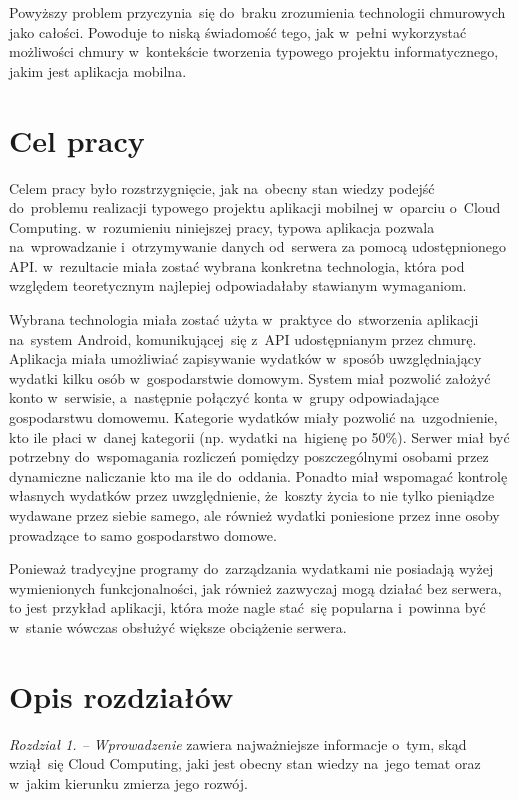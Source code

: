 \documentclass[12pt,a4paper,twoside,titlepage,openright]{book}
\begin{document}
Powyższy problem przyczynia~się do~braku zrozumienia technologii chmurowych jako całości. Powoduje to niską świadomość tego, jak w~pełni wykorzystać możliwości chmury w~kontekście tworzenia typowego projektu informatycznego, jakim jest aplikacja mobilna.





\section*{Cel pracy}


Celem pracy było rozstrzygnięcie, jak na~obecny stan wiedzy podejść do~problemu realizacji typowego projektu aplikacji mobilnej w~oparciu o~Cloud Computing. w~rozumieniu niniejszej pracy, typowa aplikacja pozwala na~wprowadzanie i~otrzymywanie danych od~serwera za pomocą udostępnionego API. w~rezultacie miała zostać wybrana konkretna technologia, która pod względem teoretycznym najlepiej odpowiadałaby stawianym wymaganiom.

Wybrana technologia miała zostać użyta w~praktyce do~stworzenia aplikacji na~system Android, komunikującej~się z~API udostępnianym przez chmurę. Aplikacja miała umożliwiać zapisywanie wydatków w~sposób uwzględniający wydatki kilku osób w~gospodarstwie domowym. System miał pozwolić założyć konto w~serwisie, a~następnie połączyć konta w~grupy odpowiadające gospodarstwu domowemu. Kategorie wydatków miały pozwolić na~uzgodnienie, kto ile płaci w~danej kategorii (np. wydatki na~higienę po 50\%). Serwer miał być potrzebny do~wspomagania rozliczeń pomiędzy poszczególnymi osobami przez dynamiczne naliczanie kto ma ile do~oddania. Ponadto miał wspomagać kontrolę własnych wydatków przez uwzględnienie, że~koszty życia to nie tylko pieniądze wydawane przez siebie samego, ale również wydatki poniesione przez inne osoby prowadzące to samo gospodarstwo domowe. 

Ponieważ tradycyjne programy do~zarządzania wydatkami nie posiadają wyżej wymienionych funkcjonalności, jak również zazwyczaj mogą działać bez serwera, to jest przykład aplikacji, która może nagle stać~się popularna i~powinna być w~stanie wówczas obsłużyć większe obciążenie serwera. 



\section*{Opis rozdziałów}
\textit{Rozdział 1. -- Wprowadzenie} zawiera najważniejsze informacje o~tym, skąd wziął~się Cloud Computing, jaki jest obecny stan wiedzy na~jego temat oraz w~jakim kierunku zmierza jego rozwój. 
\end{document}
